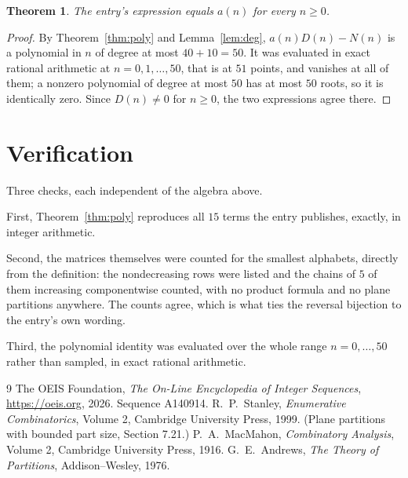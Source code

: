 \documentclass[11pt,a4paper]{article}
\theoremstyle{plain}
\newtheorem{theorem}{Theorem}
\theoremstyle{definition}
\begin{document}
\begin{theorem}
The entry's expression equals $a(n)$ for every $n\ge0$.
\end{theorem}

\begin{proof}
By Theorem~\ref{thm:poly} and Lemma~\ref{lem:deg}, $a(n)D(n)-N(n)$ is a polynomial in $n$
of degree at most $40+10=50$. It was evaluated in exact rational arithmetic at
$n=0,1,\dots,50$, that is at $51$ points, and vanishes at all of them; a nonzero polynomial
of degree at most $50$ has at most $50$ roots, so it is identically zero. Since $D(n)\neq0$
for $n\ge0$, the two expressions agree there.
\end{proof}

\section{Verification}

Three checks, each independent of the algebra above.

First, Theorem~\ref{thm:poly} reproduces all $15$ terms the entry publishes,
exactly, in integer arithmetic.

Second, the matrices themselves were counted for the smallest alphabets, directly from the
definition: the nondecreasing rows were listed and the chains of $5$ of them increasing
componentwise counted, with no product formula and no plane partitions anywhere. The counts
agree, which is what ties the reversal bijection to the entry's own wording.

Third, the polynomial identity was evaluated over the whole range $n=0,\dots,50$ rather than
sampled, in exact rational arithmetic.

\begin{thebibliography}{9}
 The OEIS Foundation, \emph{The On-Line Encyclopedia of Integer
Sequences}, \url{https://oeis.org}, 2026. Sequence A140914.
 R.~P.~Stanley, \emph{Enumerative Combinatorics}, Volume 2, Cambridge
University Press, 1999. (Plane partitions with bounded part size, Section 7.21.)
 P.~A.~MacMahon, \emph{Combinatory Analysis}, Volume 2, Cambridge
University Press, 1916.
 G.~E.~Andrews, \emph{The Theory of Partitions}, Addison--Wesley, 1976.
\end{thebibliography}
\end{document}
